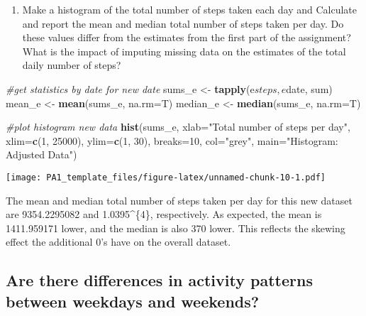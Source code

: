 \documentclass[]{article}
\newenvironment{Shaded}{\begin{snugshade}}{\end{snugshade}}
\newcommand{\KeywordTok}[1]{\textcolor[rgb]{0.13,0.29,0.53}{\textbf{{#1}}}}
\newcommand{\DataTypeTok}[1]{\textcolor[rgb]{0.13,0.29,0.53}{{#1}}}
\newcommand{\DecValTok}[1]{\textcolor[rgb]{0.00,0.00,0.81}{{#1}}}
\newcommand{\StringTok}[1]{\textcolor[rgb]{0.31,0.60,0.02}{{#1}}}
\newcommand{\CommentTok}[1]{\textcolor[rgb]{0.56,0.35,0.01}{\textit{{#1}}}}
\newcommand{\NormalTok}[1]{{#1}}
\providecommand{\tightlist}{%
  \setlength{\itemsep}{0pt}\setlength{\parskip}{0pt}}
\begin{document}
\begin{enumerate}
\def\labelenumi{\arabic{enumi}.}
\setcounter{enumi}{3}
\tightlist
\item
  Make a histogram of the total number of steps taken each day and
  Calculate and report the mean and median total number of steps taken
  per day. Do these values differ from the estimates from the first part
  of the assignment? What is the impact of imputing missing data on the
  estimates of the total daily number of steps?
\end{enumerate}

\begin{Shaded}
\begin{Highlighting}[]
\CommentTok{#get statistics by date for new date}
\NormalTok{sums_e <-}\StringTok{ }\KeywordTok{tapply}\NormalTok{(e$steps, e$date, sum)}
\NormalTok{mean_e <-}\StringTok{ }\KeywordTok{mean}\NormalTok{(sums_e, }\DataTypeTok{na.rm=}\NormalTok{T)}
\NormalTok{median_e <-}\StringTok{ }\KeywordTok{median}\NormalTok{(sums_e, }\DataTypeTok{na.rm=}\NormalTok{T)}

\CommentTok{#plot histogram new data}
\KeywordTok{hist}\NormalTok{(sums_e, }\DataTypeTok{xlab=}\StringTok{"Total number of steps per day"}\NormalTok{, }
     \DataTypeTok{xlim=}\KeywordTok{c}\NormalTok{(}\DecValTok{1}\NormalTok{, }\DecValTok{25000}\NormalTok{), }\DataTypeTok{ylim=}\KeywordTok{c}\NormalTok{(}\DecValTok{1}\NormalTok{, }\DecValTok{30}\NormalTok{), }\DataTypeTok{breaks=}\DecValTok{10}\NormalTok{, }\DataTypeTok{col=}\StringTok{"grey"}\NormalTok{,}
     \DataTypeTok{main=}\StringTok{"Histogram: Adjusted Data"}\NormalTok{)}
\end{Highlighting}
\end{Shaded}

\texttt{[image: PA1\_template\_files/figure-latex/unnamed-chunk-10-1.pdf]}

The mean and median total number of steps taken per day for this new
dataset are 9354.2295082 and 1.0395\^{}\{4\}, respectively. As
expected, the mean is 1411.959171 lower, and the median is also 370
lower. This reflects the skewing effect the additional 0's have on the
overall dataset.

\subsection{Are there differences in activity patterns between weekdays
and
weekends?}\label{are-there-differences-in-activity-patterns-between-weekdays-and-weekends}
\end{document}
